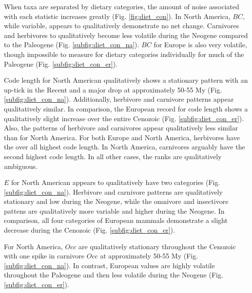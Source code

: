 \documentclass[12pt,letterpaper]{article}
\begin{document}
When taxa are separated by dietary categories, the amount of noise associated with each statistic increases greatly (Fig. \ref{fig:diet_con}). In North America, \(BC\), while variable, appears to qualitatively demonstrate no net change. Carnivores and herbivores to qualitatively become less volatile during the Neogene compared to the Paleogene (Fig. \ref{subfig:diet_con_na}). \(BC\) for Europe is also very volatile, though impossible to measure for dietary categories individually for much of the Paleogene (Fig. \ref{subfig:diet_con_er}).

Code length for North American qualitatively shows a stationary pattern with an up-tick in the Recent and a major drop at approximately 50-55 My (Fig. \ref{subfig:diet_con_na}). Additionally, herbivore and carnivore patterns appear qualitatively similar. In comparison, the European record for code length shows a qualitatively slight increase over the entire Cenozoic (Fig. \ref{subfig:diet_con_er}). Also, the patterns of herbivore and carnivores appear qualitatively less similar than for North America. For both Europe and North America, herbivores have the over all highest code length. In North America, carnivores arguably have the second highest code length. In all other cases, the ranks are qualitatively ambiguous.

\(E\) for North American appears to qualitatively have two categories (Fig. \ref{subfig:diet_con_na}). Herbivore and carnivore patterns are qualitatively stationary and low during the Neogene, while the omnivore and insectivore pattens are qualitatively more variable and higher during the Neogene. In comparison, all four categories of European mammals demonstrate a slight decrease during the Cenozoic (Fig. \ref{subfig:diet_con_er}).

For North America, \(Occ\) are qualitatively stationary throughout the Cenozoic with one spike in carnivore \(Occ\) at approximately 50-55 My (Fig. \ref{subfig:diet_con_na}). In contrast, European values are highly volatile throughout the Paleogene and then less volatile during the Neogene (Fig. \ref{subfig:diet_con_er}).
\end{document}
